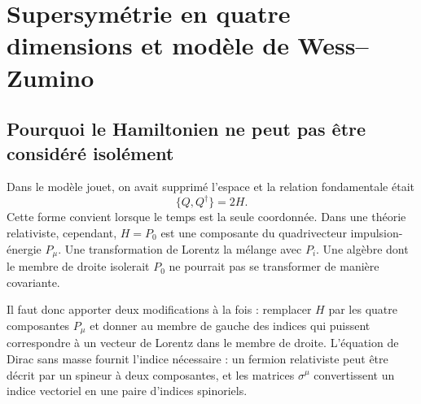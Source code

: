 \chapter{Supersymétrie en quatre dimensions et modèle de Wess--Zumino}


\section{Pourquoi le Hamiltonien ne peut pas être considéré isolément}

Dans le modèle jouet, on avait supprimé l’espace et la relation fondamentale était
\begin{equation}
\{Q,Q^\dagger\}=2H.
\label{eq:l8-time-only-algebra}
\end{equation}
Cette forme convient lorsque le temps est la seule coordonnée. Dans une théorie relativiste, cependant, \(H=P_0\) est une composante du quadrivecteur impulsion-énergie \(P_\mu\). Une transformation de Lorentz la mélange avec \(P_i\). Une algèbre dont le membre de droite isolerait \(P_0\) ne pourrait pas se transformer de manière covariante.

Il faut donc apporter deux modifications à la fois : remplacer \(H\) par les quatre composantes \(P_\mu\) et donner au membre de gauche des indices qui puissent correspondre à un vecteur de Lorentz dans le membre de droite. L’équation de Dirac sans masse fournit l’indice nécessaire : un fermion relativiste peut être décrit par un spineur à deux composantes, et les matrices \(\sigma^\mu\) convertissent un indice vectoriel en une paire d’indices spinoriels.

